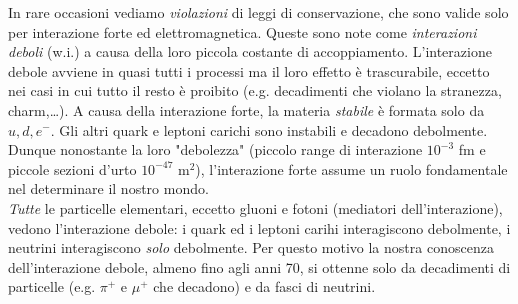In rare occasioni vediamo \textit{violazioni} di leggi di conservazione, che sono valide solo per interazione forte ed elettromagnetica. Queste sono note come \textit{interazioni deboli} (w.i.) a causa della loro piccola costante di accoppiamento. L'interazione debole avviene in quasi tutti i processi ma il loro effetto è trascurabile, eccetto nei casi in cui tutto il resto è proibito (e.g. decadimenti che violano la stranezza, charm,\dots). A causa della interazione forte, la materia \textit{stabile} è formata solo da $u,d,e^-$. Gli altri quark e leptoni carichi sono instabili e decadono debolmente. Dunque nonostante la loro "debolezza" (piccolo range di interazione $10^{-3}$ fm e piccole sezioni d'urto $10^{-47}$ m$^2$), l'interazione forte assume un ruolo fondamentale nel determinare il nostro mondo.\\
\textit{Tutte} le particelle elementari, eccetto gluoni e fotoni (mediatori dell'interazione), vedono l'interazione debole: i quark ed i leptoni carihi interagiscono debolmente, i neutrini interagiscono \textit{solo} debolmente. Per questo motivo la nostra conoscenza dell'interazione debole, almeno fino agli anni 70, si ottenne solo da decadimenti di particelle (e.g. $\pi^+$ e $\mu^+$ che decadono) e da fasci di neutrini.
